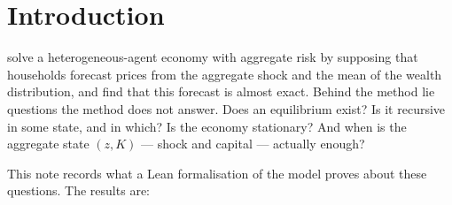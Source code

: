 \section{Introduction}\label{sec:intro}

\citet{krusellsmith1998} solve a heterogeneous-agent economy with aggregate risk by supposing that
households forecast prices from the aggregate shock and the mean of the wealth distribution, and
find that this forecast is almost exact. Behind the method lie questions the method does not
answer. Does an equilibrium exist? Is it recursive in some state, and in which? Is the economy
stationary? And when is the aggregate state $(z,K)$ --- shock and capital --- actually enough?

This note records what a Lean formalisation of the model proves about these questions. The
results are:

